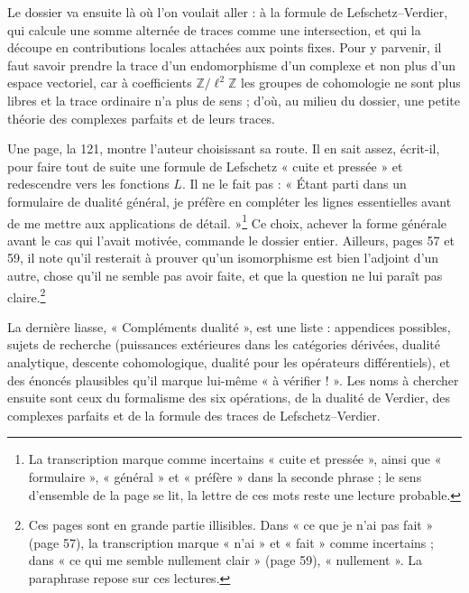 \documentclass[11pt,a4paper]{article}
\begin{document}
\begin{resume}
Le dossier va ensuite là où l'on voulait aller : à la formule de
Lefschetz--Verdier, qui calcule une somme alternée de traces comme une
intersection, et qui la découpe en contributions locales attachées aux points
fixes. Pour y parvenir, il faut savoir prendre la trace d'un endomorphisme
d'un complexe et non plus d'un espace vectoriel, car à coefficients
$\mathbb{Z}/\ell^{2}\mathbb{Z}$ les groupes de cohomologie ne sont plus libres et
la trace ordinaire n'a plus de sens ; d'où, au milieu du dossier, une petite
théorie des complexes parfaits et de leurs traces.

Une page, la 121, montre l'auteur choisissant sa route. Il en sait assez,
écrit-il, pour faire tout de suite une formule de Lefschetz « cuite et
pressée » et redescendre vers les fonctions $L$. Il ne le fait pas : « Étant
parti dans un formulaire de dualité général, je préfère en compléter les lignes
essentielles avant de me mettre aux applications de détail. »\footnote{La
transcription marque comme incertains « cuite et pressée », ainsi que
« formulaire », « général » et « préfère » dans la seconde phrase ; le sens
d'ensemble de la page se lit, la lettre de ces mots reste une lecture
probable.} Ce choix, achever la forme générale avant le cas qui l'avait
motivée, commande le dossier entier. Ailleurs, pages 57 et 59, il note qu'il
resterait à prouver qu'un isomorphisme est bien l'adjoint d'un autre, chose
qu'il ne semble pas avoir faite, et que la question ne lui paraît pas
claire.\footnote{Ces pages sont en grande partie illisibles. Dans « ce que je
n'ai pas fait » (page 57), la transcription marque « n'ai » et « fait » comme
incertains ; dans « ce qui me semble nullement clair » (page 59),
« nullement ». La paraphrase repose sur ces lectures.}

La dernière liasse, « Compléments dualité », est une liste : appendices
possibles, sujets de recherche (puissances extérieures dans les catégories
dérivées, dualité analytique, descente cohomologique, dualité pour les
opérateurs différentiels), et des énoncés plausibles qu'il marque lui-même
« à vérifier ! ». Les noms à chercher ensuite sont ceux du formalisme des six
opérations, de la dualité de Verdier, des complexes parfaits et de la formule
des traces de Lefschetz--Verdier.

\end{resume}
\end{document}
